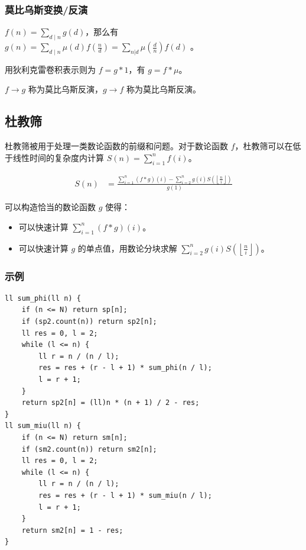 \documentclass[UTF8]{ctexart}
\begin{document}
\begin{sloppypar}
\subsubsection{莫比乌斯变换/反演}

$f(n)=\sum_{d\mid n}g(d)$，那么有 $g(n)=\sum_{d\mid n}\mu(d)f(\frac{n}{d})=\sum_{n|d}\mu(\frac{d}{n})f(d)$
。

用狄利克雷卷积表示则为 $f=g\ast1$，有 $g=f\ast\mu$。

$f \rightarrow g$ 称为莫比乌斯反演，$g \rightarrow f$ 称为莫比乌斯反演。

\subsection{杜教筛}

杜教筛被用于处理一类数论函数的前缀和问题。对于数论函数 $f$，杜教筛可以在低于线性时间的复杂度内计算 $S(n)=\sum_{i=1}^{n}f(i)$。

$$
\begin{aligned}
    S(n) & = \frac{\sum_{i=1}^n (f * g)(i) - \sum_{i=2}^n g(i)S\left(\left\lfloor\frac{n}{i}\right\rfloor\right)}{g(1)}
\end{aligned}
$$

可以构造恰当的数论函数 $g$ 使得：

\begin{itemize}
   \item 可以快速计算 $\sum_{i=1}^n(f * g)(i)$。
   \item 可以快速计算 $g$ 的单点值，用数论分块求解 $\sum_{i=2}^ng(i)S\left(\left\lfloor\frac{n}{i}\right\rfloor\right)$。
\end{itemize}

\subsubsection{示例}

\begin{lstlisting}[style=cpp]
ll sum_phi(ll n) {
    if (n <= N) return sp[n];
    if (sp2.count(n)) return sp2[n];
    ll res = 0, l = 2;
    while (l <= n) {
        ll r = n / (n / l);
        res = res + (r - l + 1) * sum_phi(n / l);
        l = r + 1;
    }
    return sp2[n] = (ll)n * (n + 1) / 2 - res;
}
ll sum_miu(ll n) {
    if (n <= N) return sm[n];
    if (sm2.count(n)) return sm2[n];
    ll res = 0, l = 2;
    while (l <= n) {
        ll r = n / (n / l);
        res = res + (r - l + 1) * sum_miu(n / l);
        l = r + 1;
    }
    return sm2[n] = 1 - res;
}
\end{lstlisting}


\end{sloppypar}
\end{document}
